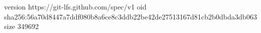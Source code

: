 version https://git-lfs.github.com/spec/v1
oid sha256:56a70d8447a7ddf080b8a6ce8c3ddb22be42de27513167d81cb2b0dbda3db063
size 349692
